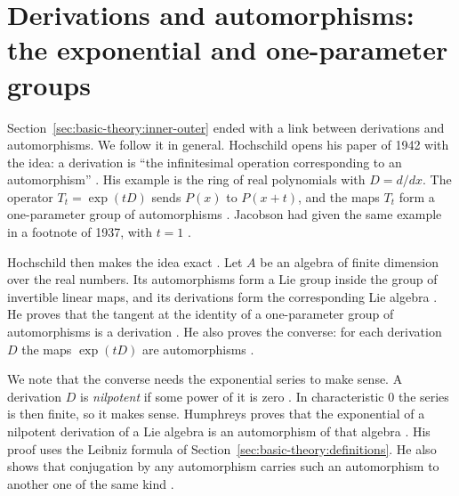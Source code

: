 \section{Derivations and automorphisms: the exponential and one-parameter groups}\label{sec:basic-theory:exponential}

Section~\ref{sec:basic-theory:inner-outer} ended with a link between derivations
and automorphisms. We follow it in general. Hochschild opens his paper of 1942
with the idea: a derivation is ``the infinitesimal operation corresponding to an
automorphism'' \cite[p.~677]{Hochschild1942}. His example is the ring of real
polynomials with $D = d/dx$. The operator $T_t = \exp(tD)$ sends $P(x)$ to
$P(x+t)$, and the maps $T_t$ form a one-parameter group of automorphisms
\cite[p.~677]{Hochschild1942}. Jacobson had given the same example in a
footnote of 1937, with $t = 1$ \cite[p.~206]{Jacobson1937}.

Hochschild then makes the idea exact \cite[p.~678]{Hochschild1942}. Let $A$ be an algebra of finite dimension over the real numbers. Its automorphisms form a Lie group inside the group of invertible linear maps, and its derivations form the corresponding Lie algebra \cite[p.~678]{Hochschild1942}. He proves that the tangent at the identity of a one-parameter group of automorphisms is a derivation \cite[p.~678]{Hochschild1942}. He also proves the converse: for each derivation $D$ the maps $\exp(tD)$ are automorphisms \cite[p.~678]{Hochschild1942}.

We note that the converse needs the exponential series to make sense. A
derivation $D$ is \emph{nilpotent} if some power of it is zero \cite[\S2.3, p.~8]{Humphreys1972}. In characteristic
$0$ the series is then finite, so it makes sense. Humphreys proves that the
exponential of a nilpotent derivation of a Lie algebra is an automorphism of that
algebra \cite[\S2.3, pp.~8--9]{Humphreys1972}. His proof uses the Leibniz
formula of Section~\ref{sec:basic-theory:definitions}. He also shows that conjugation by any automorphism carries such an automorphism to another one of the same kind \cite[\S2.3, p.~9]{Humphreys1972}.

